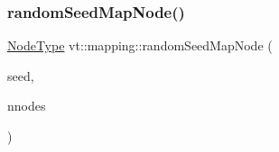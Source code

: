 \mbox{\label{namespacevt_1_1mapping_accca64daff113b58cd733710ab4e0854}} 
\subsubsection{\texorpdfstring{random\+Seed\+Map\+Node()}{randomSeedMapNode()}}
{\footnotesize\ttfamily \hyperlink{namespacevt_a866da9d0efc19c0a1ce79e9e492f47e2}{Node\+Type} vt\+::mapping\+::random\+Seed\+Map\+Node (\begin{DoxyParamCaption}\item[{\hyperlink{namespacevt_ae2e13198bdef4d5b8e603d6c1c7f0969}{Seed\+Type}}]{seed,  }\item[{\hyperlink{namespacevt_a866da9d0efc19c0a1ce79e9e492f47e2}{Node\+Type}}]{nnodes }\end{DoxyParamCaption})}

